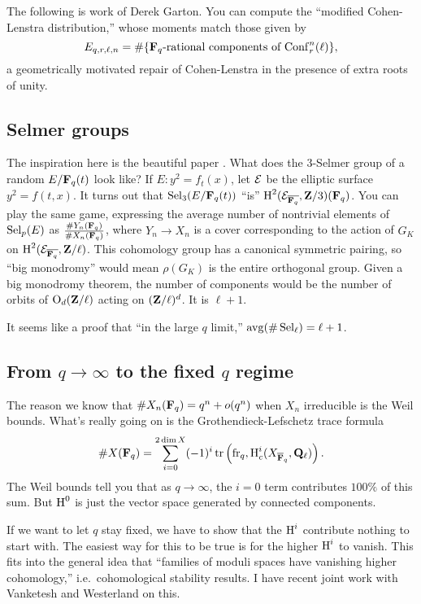 The following is work of Derek Garton. You can compute the ``modified 
Cohen-Lenstra distribution,'' whose moments match those given by 
\[
  E_{q,r,\ell,n} = \#\{\text{$\mathbf{F}_q$-rational components of $\operatorname{Conf}_r^n(\ell)$}\} ,
\]
a geometrically motivated repair of Cohen-Lenstra in the presence of extra 
roots of unity. 





\subsection{Selmer groups}

The inspiration here is the beautiful paper \cite{j02}. What does the 3-Selmer 
group of a random $E/\mathbf{F}_q(t)$ look like? If $E:y^2=f_t(x)$, let $\mathcal{E}$ be the 
elliptic surface $y^2=f(t,x)$. It turns out that 
$\operatorname{Sel}_3(E/\mathbf{F}_q(t))$ ``is'' $\operatorname{H}^2(\mathcal{E}_{\overline{\mathbf{F}_q}},\mathbf{Z}/3)(\mathbf{F}_q)$. You 
can play the same game, expressing the average number of nontrivial elements of 
$\operatorname{Sel}_p(E)$ as $\frac{\#Y_n(\mathbf{F}_q)}{\#X_n(\mathbf{F}_q)}$, where $Y_n\to X_n$ is a 
cover corresponding to the action of $G_K$ on 
$\operatorname{H}^2(\mathcal{E}_{\overline{\mathbf{F}_q}},\mathbf{Z}/\ell)$. This cohomology group has a canonical 
symmetric pairing, so ``big monodromy'' would mean $\rho(G_K)$ is the entire 
orthogonal group. Given a big monodromy theorem, the number of components would 
be the number of orbits of $\operatorname{O}_d(\mathbf{Z}/\ell)$ acting on 
$(\mathbf{Z}/\ell)^d$. It is $\ell+1$. 

It seems like a proof that ``in the large $q$ limit,'' 
$\operatorname{avg}(\#\operatorname{Sel}_\ell)=\ell+1$. 





\subsection{From \texorpdfstring{$q\to \infty$}{q to infty} to the fixed \texorpdfstring{$q$}{q} regime}

The reason we know that $\# X_n(\mathbf{F}_q)=q^n+o(q^n)$ when $X_n$ irreducible is 
the Weil bounds. What's really going on is the Grothendieck-Lefschetz trace 
formula 
\[
  \# X(\mathbf{F}_q) = \sum_{i=0}^{2\dim X} (-1)^i \operatorname{tr}\left(\operatorname{fr}_q,\operatorname{H}_c^i(X_{\overline{\mathbf{F}}_q},\mathbf{Q}_\ell)\right) .
\]
The Weil bounds tell you that as $q\to \infty$, the $i=0$ term contributes 
$100\%$ of this sum. But $\operatorname{H}^0$ is just the vector space generated by connected 
components. 

If we want to let $q$ stay fixed, we have to show that the $\operatorname{H}^i$ contribute 
nothing to start with. The easiest way for this to be true is for the higher 
$\operatorname{H}^i$ to vanish. This fits into the general idea that ``families of moduli 
spaces have vanishing higher cohomology,'' i.e.~cohomological stability 
results. I have recent joint work with Vanketesh and Westerland on this. 




